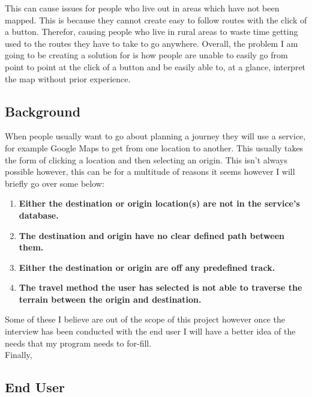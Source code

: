 \begin{flushleft}
        This can cause issues for people who live out in areas which have not been mapped. This is because they cannot create easy to follow routes with the click of a button. Therefor, 
        causing people who live in rural areas to waste time getting used to the routes they have to take to go anywhere. Overall, the problem I am going to be creating a solution for is 
        how people are unable to easily go from point to point at the click of a button and be easily able to, at a glance, interpret the map without prior experience. \\

        \subsection{Background}
        \bk
        When people usually want to go about planning a journey they will use a service, for example Google Maps to get from one location to another. This usually takes the form of clicking 
        a location and then selecting an origin. This isn't always possible however, this can be for a multitude of reasons it seems however I will briefly go over some below:\\
        
        \begin{enumerate}
            \item \textbf{Either the destination or origin location(s) are not in the service's database.}
            \item \textbf{The destination and origin have no clear defined path between them.}
            \item \textbf{Either the destination or origin are off any predefined track.}
            \item \textbf{The travel method the user has selected is not able to traverse the terrain between the origin and destination.}
        \end{enumerate}

        \bk
        Some of these I believe are out of the scope of this project however once the interview has been conducted with the end user I will have a better idea of the needs that my program needs to for-fill.\\

        \bk
        Finally, 

        \bk
        
        \subsection{End User}

\end{flushleft}
